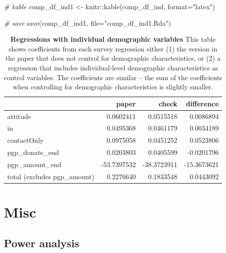 \documentclass[
]{article}
\newenvironment{Shaded}{\begin{snugshade}}{\end{snugshade}}
\newcommand{\AttributeTok}[1]{\textcolor[rgb]{0.77,0.63,0.00}{#1}}
\newcommand{\CommentTok}[1]{\textcolor[rgb]{0.56,0.35,0.01}{\textit{#1}}}
\newcommand{\FunctionTok}[1]{\textcolor[rgb]{0.00,0.00,0.00}{#1}}
\newcommand{\NormalTok}[1]{#1}
\newcommand{\OtherTok}[1]{\textcolor[rgb]{0.56,0.35,0.01}{#1}}
\newcommand{\SpecialCharTok}[1]{\textcolor[rgb]{0.00,0.00,0.00}{#1}}
\newcommand{\StringTok}[1]{\textcolor[rgb]{0.31,0.60,0.02}{#1}}
\begin{document}
\begin{Shaded}
\begin{Highlighting}[]
\CommentTok{\# kable}
\NormalTok{comp\_df\_ind1 }\OtherTok{\textless{}{-}}\NormalTok{ knitr}\SpecialCharTok{::}\FunctionTok{kable}\NormalTok{(comp\_df\_ind, }\AttributeTok{format=}\StringTok{"latex"}\NormalTok{)}

\CommentTok{\# save}
\FunctionTok{save}\NormalTok{(comp\_df\_ind1, }\AttributeTok{file=}\StringTok{"comp\_df\_ind1.Rda"}\NormalTok{)}
\end{Highlighting}
\end{Shaded}

\begin{table}[H]
\begin{center}
\label{tab:comp_df_ind1}
\caption{\textbf{Regressions with individual demographic variables} This table shows coefficients from each survey regression either (1) the version in the paper that does not control for demographic characteristics, or (2) a regression that includes individual-level demographic characteristics as control variables. The coefficients are similar -- the sum of the coefficients when controlling for demographic characteristics is slightly smaller.}
\smallskip

\begin{tabular}{l|r|r|r}
\hline
  & paper & check & difference\\
\hline
attitude & 0.0602411 & 0.0515518 & 0.0086894\\
\hline
in & 0.0495368 & 0.0461179 & 0.0034189\\
\hline
contactOnly & 0.0975058 & 0.0451252 & 0.0523806\\
\hline
pgp\_donate\_end & 0.0203803 & 0.0405599 & -0.0201796\\
\hline
pgp\_amount\_end & -53.7397532 & -38.3723911 & -15.3673621\\
\hline
total (excludes pgp\_amount) & 0.2276640 & 0.1833548 & 0.0443092\\
\hline
\end{tabular}


\end{center}
\end{table}

\hypertarget{misc}{%
\section{Misc}\label{misc}}

\hypertarget{power-analysis}{%
\subsection{Power analysis}\label{power-analysis}}
\end{document}
